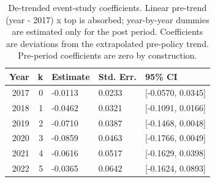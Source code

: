 \begin{table}[ht]
\centering
\caption{De-trended event-study coefficients. Linear pre-trend (year - 2017) x top is absorbed; year-by-year dummies are estimated only for the post period. Coefficients are deviations from the extrapolated pre-policy trend. Pre-period coefficients are zero by construction.} 
\label{tab:phase4_within_intensive_did_eventstudy_detrended}
\begin{tabular}{rrlll}
  \toprule
Year & k & Estimate & Std. Err. & 95\% CI \\ 
  \midrule
2017 &   0 & -0.0113 & 0.0233 & [-0.0570, 0.0345] \\ 
  2018 &   1 & -0.0462 & 0.0321 & [-0.1091, 0.0166] \\ 
  2019 &   2 & -0.0710 & 0.0387 & [-0.1468, 0.0048] \\ 
  2020 &   3 & -0.0859 & 0.0463 & [-0.1766, 0.0049] \\ 
  2021 &   4 & -0.0616 & 0.0517 & [-0.1629, 0.0398] \\ 
  2022 &   5 & -0.0365 & 0.0642 & [-0.1624, 0.0893] \\ 
   \bottomrule
\end{tabular}
\end{table}
